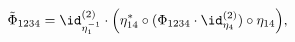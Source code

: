 \begin{equation}
  {\tilde\Phi}_{1234}=\id^{(2)}_{\eta_1^{-1}}\cdot\Bigl(
  \eta_{14}^\ast
  \circ(\Phi_{1234}\cdot\id^{(2)}_{\eta_4})
  \circ\eta_{14}\Bigr),
\end{equation}

